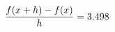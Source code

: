 \documentclass[preview]{standalone}
\begin{document}
\begin{align*}
\special{dvisvgm:raw <g id='unique000'>}\frac{f(x+h)-f(x)}{h} = 3.498\special{dvisvgm:raw </g>}
\end{align*}
\end{document}
